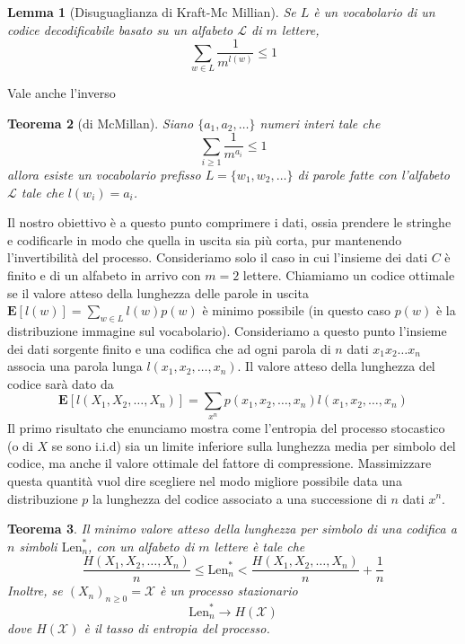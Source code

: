 \documentclass[a4paper,11pt]{book}
\theoremstyle{plain}
\newtheorem{teo}{Teorema}[chapter]
\newtheorem{lemma}[teo]{Lemma}
\theoremstyle{definition}
\theoremstyle{remark}
\newcommand{\E}{\mathbf{E}}
\begin{document}
\begin{lemma}[Disuguaglianza di Kraft-Mc Millian]
	Se $L$ è un vocabolario di un codice decodificabile basato su un alfabeto $\mathcal{L}$ di $m$ lettere,
	\begin{equation*}
		\sum_{w\in L}{\frac{1}{m^{l(w)}}}\leq 1
	\end{equation*}
\end{lemma}
Vale anche l'inverso
\begin{teo}[di McMillan]
	Siano $\{a_1,a_2,\ldots\}$ numeri interi tale che 
	\begin{equation*}
		\sum_{i\geq 1}{\frac{1}{m^{a_i}}}\leq 1
	\end{equation*}
	allora esiste un vocabolario prefisso $L=\{w_1,w_2,\ldots\}$ di parole fatte con l'alfabeto $\mathcal{L}$ tale che $l(w_i) = a_i$.
\end{teo}
Il nostro obiettivo è a questo punto comprimere i dati, ossia prendere le stringhe e codificarle in modo che quella in uscita sia più corta, pur mantenendo l'invertibilità del processo. Consideriamo solo il caso in cui l'insieme dei dati $C$ è finito e di un alfabeto in arrivo con $m=2$ lettere.\newline
Chiamiamo un codice ottimale se il valore atteso della lunghezza delle parole in uscita $\E[l(w)]=\sum_{w\in L}{l(w)p(w)}$ è minimo possibile (in questo caso $p(w)$ è la distribuzione immagine sul vocabolario). \newline
Consideriamo a questo punto l'insieme dei dati sorgente finito e una codifica che ad ogni parola di $n$ dati $x_1x_2\ldots x_n$ associa una parola lunga $l(x_1,x_2,\ldots ,x_n)$. Il valore atteso della lunghezza del codice sarà dato da
\begin{equation*}
	\E[l(X_1,X_2,\ldots,X_n)]=\sum_{x^n}{p(x_1,x_2,\ldots, x_n)l(x_1,x_2,\ldots, x_n)}
\end{equation*}
Il primo risultato che enunciamo mostra come l'entropia del processo stocastico (o di $X$ se sono i.i.d) sia un limite inferiore sulla lunghezza media per simbolo del codice, ma anche il valore ottimale del fattore di compressione.\newline
Massimizzare questa quantità vuol dire scegliere nel modo migliore possibile data una distribuzione $p$ la lunghezza del codice associato a una successione di $n$ dati $x^n$.
\begin{teo}
	Il minimo valore atteso della lunghezza per simbolo di una codifica a $n$ simboli $\text{Len}^*_n$, con un alfabeto di $m$ lettere è tale che
	\begin{equation*}
				\frac{H(X_1,X_2,\ldots, X_n)}{n}\leq \text{Len}^*_n<\frac{H(X_1,X_2,\ldots,X_n)}{n}+\frac{1}{n}
	\end{equation*}
	Inoltre, se $(X_n)_{n\geq 0}=\mathcal{X}$ è un processo stazionario
	\begin{equation*}
		\text{Len}^*_n\rightarrow H(\mathcal{X})
	\end{equation*}
	dove $H(\mathcal{X})$ è il tasso di entropia del processo.
\end{teo}
\end{document}
